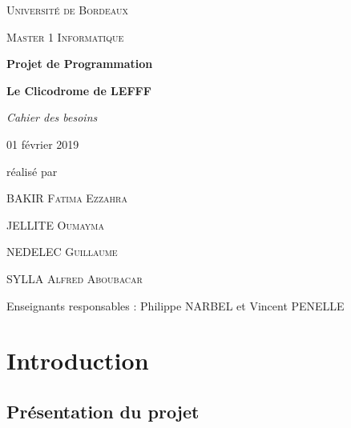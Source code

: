 \documentclass[12pt,a4paper]{article}
\begin{document}
\begin{titlepage}
\centering
{\scshape\LARGE Université de Bordeaux \par}
{\scshape\Large Master 1 Informatique  \par}
\vspace{3cm}

{\Huge\bfseries Projet de Programmation\par}
{\Huge\bfseries Le Clicodrome de LEFFF \par}
\vspace{0.5cm}
{\Large\itshape Cahier des besoins\par}
{\large 01 février 2019\par}

\vfill
réalisé par \par
BAKIR \textsc{Fatima Ezzahra} \par
JELLITE \textsc{Oumayma} \par
NEDELEC \textsc{Guillaume} \par
SYLLA  \textsc{Alfred Aboubacar} \par
\vfill

{\large Enseignants responsables : Philippe NARBEL et Vincent PENELLE\par}

\end{titlepage}

\tableofcontents

\newpage\section{Introduction}

\subsection{Présentation du projet}
\end{document}
